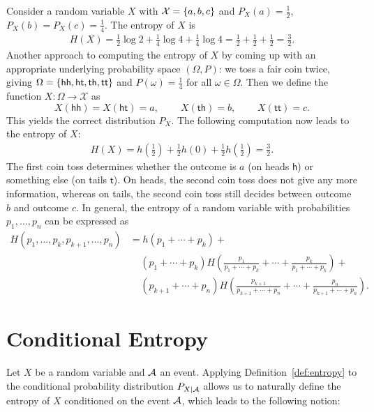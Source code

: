 \begin{example}
Consider a random variable $X$ with $\mathcal{X} = \{a,b,c\}$ and $P_X(a) = \frac{1}{2}$, $P_X(b) = P_X(c) = \frac{1}{4}$. The entropy of $X$ is
\begin{align}
H(X) = \frac{1}{2} \log 2 + \frac{1}{4} \log 4 + \frac{1}{4} \log 4 = \frac{1}{2} + \frac{1}{2} + \frac{1}{2} = \frac{3}{2}.
\end{align}
Another approach to computing the entropy of $X$ by coming up with an appropriate underlying probability space $(\Omega,P)$: we toss a fair coin twice, giving $\Omega = \{\mathsf{hh}, \mathsf{ht}, \mathsf{th}, \mathsf{tt}\}$ and $P(\omega) = \frac{1}{4}$ for all $\omega \in \Omega$. Then we define the function $X : \Omega \to \mathcal{X}$ as
\[
X(\mathsf{hh}) = X(\mathsf{ht}) = a, \ \ \ \ \ \ \ \ \ \ X(\mathsf{th}) = b, \ \ \ \ \ \ \ \ \ \ X(\mathsf{tt}) = c.
\]
This yields the correct distribution $P_X$. The following computation now leads to the entropy of $X$:
\begin{align}
H(X) = h\left(\frac{1}{2}\right) + \frac{1}{2}h(0) + \frac{1}{2}h\left(\frac{1}{2}\right) = \frac{3}{2}.
\end{align}
The first coin toss determines whether the outcome is $a$ (on heads $\mathsf{h}$) or something else (on tails $\mathsf{t}$). On heads, the second coin toss does not give any more information, whereas on tails, the second coin toss still decides between outcome $b$ and outcome $c$. In general, the entropy of a random variable with probabilities $p_1, ..., p_n$ can be expressed as
\begin{align}
H(p_1, ..., p_k, p_{k+1}, ..., p_n) &= h(p_1 + \cdots + p_k) +\nonumber\\
&\ \ \ \ \ (p_1 + \cdots + p_k) H\left(\frac{p_1}{p_1+\cdots+p_k} + \cdots + \frac{p_k}{p_1+\cdots+p_k}\right) +\nonumber\\
&\ \ \ \ \ (p_{k+1} + \cdots + p_n)H\left(\frac{p_{k+1}}{p_{k+1}+\cdots+p_n} + \cdots + \frac{p_n}{p_{k+1}+\cdots+p_n}\right).
\end{align}
\end{example}

\section{Conditional Entropy}
Let $X$ be a random variable and $\cal A$ an event. Applying Definition~\ref{def:entropy} to the conditional probability distribution $P_{X|\cal A}$ allows us to naturally define the entropy of $X$ conditioned on the event $\cal A$, which leads to the following notion:


